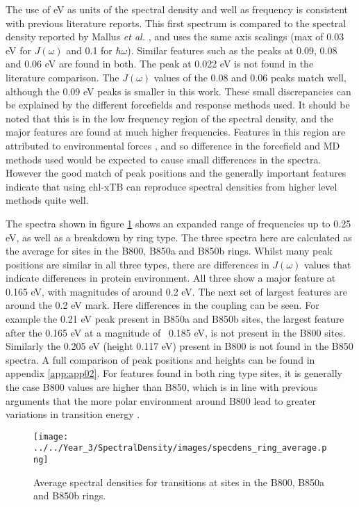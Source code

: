 The use of eV as units of the spectral density and well as frequency is consistent 
with previous literature reports. This first spectrum is compared to the spectral 
density reported by Mallus  \emph{et al.} \cite{Mallus2018}, and uses the same axis 
scalings (max of 0.03 eV for $J\left(\omega\right)$ and 0.1 for $\hbar \omega$). 
Similar features such as the peaks at 0.09, 0.08 and 0.06 eV are found in both. 
The peak at 0.022 eV is not found in the literature comparison. The $J\left(\omega\right)$ 
values of the 0.08 and 0.06 peaks match well, although the 0.09 eV peaks is smaller
in this work.
These small discrepancies can be explained by the different forcefields and response
methods used. It should be noted that this is in the low frequency region of the
spectral density, and the major features are found at much higher frequencies. Features
in this region are attributed to environmental forces \cite{Mallus2018}, and so 
difference in the forcefield and MD methods used would be expected to cause small
differences in the spectra. However the good match of peak positions and the generally
important features indicate that using chl-xTB can reproduce spectral densities
from higher level methods quite well.

The spectra shown in figure \ref{fig:specdens_sites} shows an expanded range of
frequencies up to 0.25 eV, as well as a breakdown by ring type. The three spectra
here are calculated as the average for sites in the B800, B850a and B850b rings.
Whilst many peak positions are similar in all three types, there are differences
in $J\left(\omega\right)$ values that indicate differences in protein environment.
All three show a major feature at 0.165 eV, with magnitudes of around 0.2 eV. The 
next set of largest features are around the 0.2 eV mark. Here differences in the
coupling can be seen. For example the 0.21 eV peak present in B850a and B850b sites,
the largest feature after the 0.165 eV at a magnitude of ~0.185 eV, is not present
in the B800 sites. Similarly the 0.205 eV (height 0.117 eV) present in B800 is not
found in the B850 spectra. A full comparison of peak positions and heights can be
found in appendix \ref{app:app02}. For features found in both ring type sites, it
is generally the case B800 values are higher than B850, which is in line with previous
arguments that the more polar environment around B800 lead to greater variations 
in transition energy \cite{Olbrich2010}.

\begin{figure}
    \centering
    \texttt{[image: ../../Year\_3/SpectralDensity/images/specdens\_ring\_average.png]}
    \label{fig:specdens_sites}
    \caption{Average spectral densities for \Qy transitions at sites in the B800,
    B850a and B850b rings.}
\end{figure}


